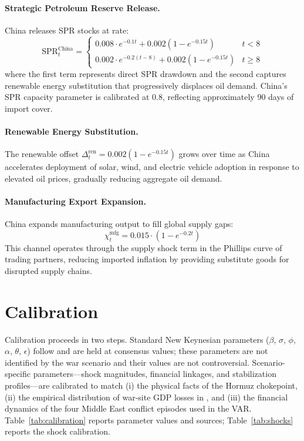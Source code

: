 \documentclass[12pt]{article}
\begin{document}
\paragraph{Strategic Petroleum Reserve Release.} China releases SPR stocks at rate:
\begin{equation}
\text{SPR}^{\text{China}}_t = \begin{cases} 0.008 \cdot e^{-0.1t} + 0.002(1-e^{-0.15t}) & t < 8 \\ 0.002 \cdot e^{-0.2(t-8)} + 0.002(1-e^{-0.15t}) & t \geq 8 \end{cases}
\label{eq:spr}
\end{equation}
where the first term represents direct SPR drawdown and the second captures renewable energy substitution that progressively displaces oil demand. China's SPR capacity parameter is calibrated at 0.8, reflecting approximately 90 days of import cover.

\paragraph{Renewable Energy Substitution.} The renewable offset $\Delta^{\text{ren}}_t = 0.002(1-e^{-0.15t})$ grows over time as China accelerates deployment of solar, wind, and electric vehicle adoption in response to elevated oil prices, gradually reducing aggregate oil demand.

\paragraph{Manufacturing Export Expansion.} China expands manufacturing output to fill global supply gaps:
\begin{equation}
\chi^{\text{mfg}}_t = 0.015 \cdot (1 - e^{-0.2t})
\label{eq:mfg}
\end{equation}
This channel operates through the supply shock term in the Phillips curve of trading partners, reducing imported inflation by providing substitute goods for disrupted supply chains.



\section{Calibration}
\label{sec:calibration}

Calibration proceeds in two steps. Standard New Keynesian parameters ($\beta$, $\sigma$, $\phi$, $\alpha$, $\theta$, $\epsilon$) follow \citet{gali2015monetary} and are held at consensus values; these parameters are not identified by the war scenario and their values are not controversial. Scenario-specific parameters---shock magnitudes, financial linkages, and stabilization profiles---are calibrated to match (i) the physical facts of the Hormuz chokepoint, (ii) the empirical distribution of war-site GDP losses in \citet{federle2026price}, and (iii) the financial dynamics of the four Middle East conflict episodes used in the VAR. Table~\ref{tab:calibration} reports parameter values and sources; Table~\ref{tab:shocks} reports the shock calibration.
\end{document}
